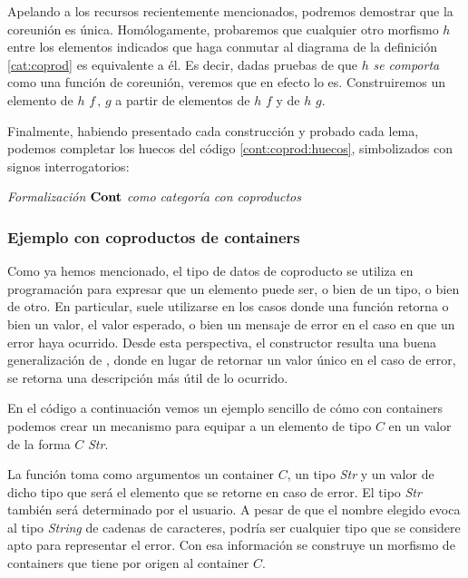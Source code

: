 Apelando a los recursos recientemente mencionados, podremos demostrar que la coreunión es única. Homólogamente, probaremos que cualquier otro morfismo $h$ entre los elementos indicados que haga conmutar al diagrama de la definición \ref{cat:coprod} es equivalente a él. Es decir, dadas pruebas de que $h$ {\it se comporta} como una función de coreunión, veremos que en efecto lo es. Construiremos un elemento de $h$ \AgdaFunction{$\cong\ [$} $f\, ,\, g$ \AgdaFunction{$]$} a partir de elementos de
$h$   \AgdaFunction{$\cong$} $f$ y de $h$   \AgdaFunction{$\cong$} $g$. 


Finalmente, habiendo presentado cada construcción y probado cada lema, podemos completar los huecos del código \ref{cont:coprod:huecos}, simbolizados con signos interrogatorios:

\begin{agdacode}{\it Formalización $\mathbf{Cont}$ como categoría con coproductos} 


\end{agdacode}

\subsubsection{Ejemplo con coproductos de containers}

Como ya hemos mencionado, el tipo de datos de coproducto se utiliza en programación para expresar que un elemento puede ser, o bien de un tipo, o bien de otro. En particular, suele utilizarse en los casos donde una función retorna o bien un valor, el valor esperado, o bien un mensaje de error en el caso en que un error haya ocurrido. Desde esta perspectiva, el constructor  resulta una buena generalización de , donde en lugar de retornar un valor único  en el caso de error, se retorna una descripción más útil de lo ocurrido. 

En el código a continuación vemos un ejemplo sencillo de cómo con containers podemos crear un mecanismo para equipar a un elemento de tipo  $C$ en un valor de la forma  $C$ {\it Str}.
  

La función  toma como argumentos un container $C$, un tipo {\it Str} y un valor de dicho tipo que será el elemento que se retorne en caso de error. El tipo {\it Str} también será determinado por el usuario. A pesar de que el nombre elegido evoca al tipo {\it String} de cadenas de caracteres, podría ser cualquier tipo que se considere apto para representar el error. Con esa información se construye un morfismo de containers que tiene por origen al container   $C$.

